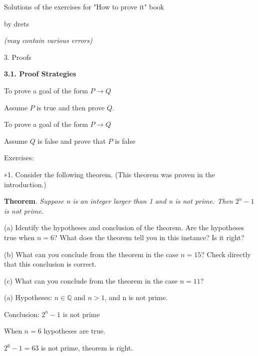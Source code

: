 \documentclass{article}
\begin{document}
\vspace*{\fill}
\centerline{\sc \large Solutions of the exercises for "How to prove it" book }
\centerline{by drets}
\centerline{\textit{(may contain various errors)}}
\vspace*{\fill}
%
\pagebreak
\centerline{\sc \large 3. Proofs}
\vspace{50pt}

\textbf{3.1. Proof Strategies}

\vspace{40pt}

To prove a goal of the form $P \to Q$

Assume $P$ is true and then prove $Q$.
\vspace{20pt}

To prove a goal of the form $P \to Q$

Assume $Q$ is false and prove that $P$ is false

\vspace{30pt}

Exercises:

\vspace{30pt}

∗1. Consider the following theorem. (This theorem was proven in the introduction.)

\textbf{Theorem}. \textit{Suppose n is an integer larger than 1 and n is not prime. Then
$2^n - 1$ is not prime.}

\hspace{12pt}(a) Identify the hypotheses and conclusion of the theorem. Are the hypotheses
true when $n = 6$? What does the theorem tell you in this instance? Is it right?

\hspace{12pt}(b) What can you conclude from the theorem in the case $n = 15$? Check
directly that this conclusion is correct.

\hspace{12pt}(c) What can you conclude from the theorem in the case $n = 11$?

\vspace{20pt}

(a) Hypotheses: $n \in \mathbb{Q}$ and $n > 1$, and n is not prime.

Conclusion: $2^n - 1$ is not prime

When $n = 6$ hypotheses are true.

$2^6-1 = 63$ is not prime, theorem is right.

\vspace{20pt}
\end{document}
